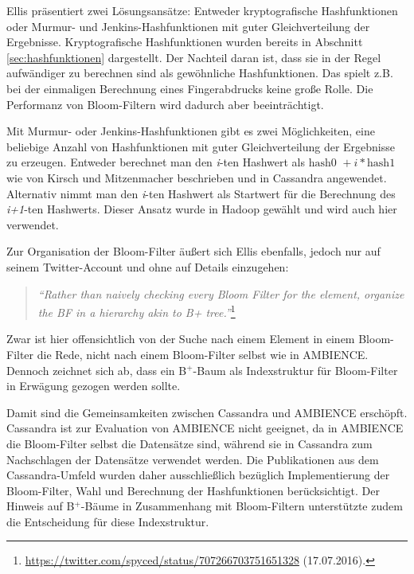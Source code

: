 Ellis präsentiert zwei Lösungsansätze: Entweder kryptografische Hashfunktionen oder Murmur- und Jenkins-Hashfunktionen mit guter Gleichverteilung der Ergebnisse. Kryptografische Hashfunktionen wurden bereits in Abschnitt \ref{sec:hashfunktionen} dargestellt. Der Nachteil daran ist, dass sie in der Regel aufwändiger zu berechnen sind als gewöhnliche Hashfunktionen. Das spielt z.B. bei der einmaligen Berechnung eines Fingerabdrucks keine große Rolle. Die Performanz von Bloom-Filtern wird dadurch aber beeinträchtigt. 

Mit Murmur- oder Jenkins-Hashfunktionen gibt es zwei Möglichkeiten, eine beliebige Anzahl von Hashfunktionen mit guter Gleichverteilung der Ergebnisse zu erzeugen. Entweder berechnet man den \textit{i}-ten Hashwert als $\text{hash0 }+ i\ast \text{hash1}$ wie von Kirsch und Mitzenmacher beschrieben und in Cassandra angewendet. Alternativ nimmt man den \textit{i}-ten Hashwert als Startwert für die Berechnung des \textit{i+1}-ten Hashwerts. Dieser Ansatz wurde in Hadoop gewählt und wird auch hier verwendet. 

Zur Organisation der Bloom-Filter äußert sich Ellis ebenfalls, jedoch nur auf seinem Twitter-Account und ohne auf Details einzugehen: 
\begin{quote}
\textit{"`Rather than naively checking every Bloom Filter for the element, organize the BF in a hierarchy akin to B+ tree."'}\footnote{\url{https://twitter.com/spyced/status/707266703751651328} (17.07.2016).}
\end{quote}
Zwar ist hier offensichtlich von der Suche nach einem Element in einem Bloom-Filter die Rede, nicht nach einem Bloom-Filter selbst wie in AMBIENCE. Dennoch zeichnet sich ab, dass ein B$^+$-Baum als Indexstruktur für Bloom-Filter in Erwägung gezogen werden sollte. 

Damit sind die Gemeinsamkeiten zwischen Cassandra und AMBIENCE erschöpft. Cassandra ist zur Evaluation von AMBIENCE nicht geeignet, da in AMBIENCE die Bloom-Filter selbst die Datensätze sind, während sie in Cassandra zum Nachschlagen der Datensätze verwendet werden. Die Publikationen aus dem Cassandra-Umfeld wurden daher ausschließlich bezüglich Implementierung der Bloom-Filter, Wahl und Berechnung der Hashfunktionen berücksichtigt. Der Hinweis auf B$^+$-Bäume in Zusammenhang mit Bloom-Filtern unterstützte zudem die Entscheidung für diese Indexstruktur. 
